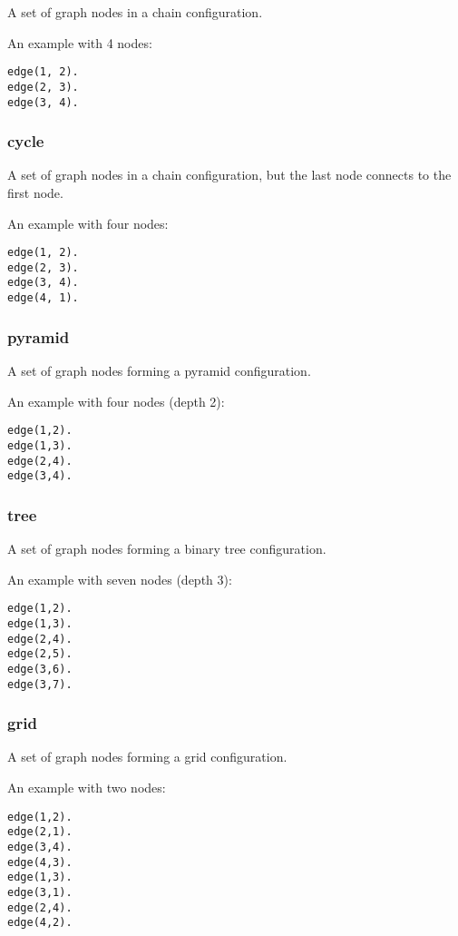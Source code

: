 A set of graph nodes in a chain configuration.

An example with 4 nodes:

\begin{Verbatim}
edge(1, 2).
edge(2, 3).
edge(3, 4).
\end{Verbatim}

\subsubsection*{cycle}

A set of graph nodes in a chain configuration, but the last node connects to the first node.

An example with four nodes:

\begin{Verbatim}
edge(1, 2).
edge(2, 3).
edge(3, 4).
edge(4, 1).
\end{Verbatim}

\subsubsection*{pyramid}

A set of graph nodes forming a pyramid configuration.

An example with four nodes (depth 2):

\begin{Verbatim}
edge(1,2).
edge(1,3).
edge(2,4).
edge(3,4).
\end{Verbatim}

\subsubsection*{tree}

A set of graph nodes forming a binary tree configuration.

An example with seven nodes (depth 3):

\begin{Verbatim}
edge(1,2).
edge(1,3).
edge(2,4).
edge(2,5).
edge(3,6).
edge(3,7).
\end{Verbatim}

\subsubsection*{grid}

A set of graph nodes forming a grid configuration.

An example with two nodes:

\begin{Verbatim}
edge(1,2).
edge(2,1).
edge(3,4).
edge(4,3).
edge(1,3).
edge(3,1).
edge(2,4).
edge(4,2).
\end{Verbatim}

